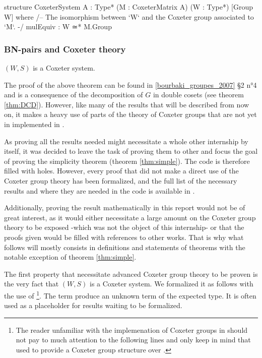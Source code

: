 \begin{leancode}
structure CoxeterSystem {A : Type*} (M : CoxeterMatrix A) (W : Type*) 
    [Group W] where
  /-- The isomorphism between `W` and the Coxeter group associated to `M`. -/
  mulEquiv : W ≃* M.Group
\end{leancode}


\subsubsection{BN-pairs and Coxeter theory}
\label{subsub:Coxeter2}  
\begin{theoreme} \label{thm:Coxeter}
    $\left( W,S \right)$ is a Coxeter system.
\end{theoreme}
 The proof of the above theorem can be found in \ref{bourbaki_groupes_2007} §2 n°4 and is a consequence of the decomposition of $G$ in double cosets (see theorem \ref{thm:DCD}). However, like many of the results that will be described from now on, it makes a heavy use of parts of the theory of Coxeter groups that are not yet in implemented in \Lean. 
    
 As proving all the results needed might necessitate a whole other internship by itself, it was decided to leave the task of proving them to other and focus the goal of proving the simplicity theorem (theorem \ref{thm:simple}). The \Lean code is therefore filled with holes. However, every proof that did not make a direct use of the Coxeter group theory has been formalized, and the full list of the necessary results and where they are needed in the code is available in . 

 Additionally, proving the result mathematically in this report would not be of great interest, as it would either necessitate a large amount on the Coxeter group theory to be exposed -which was not the object of this internship- or that the proofs given would be filled with references to other works. That is why what follows will mostly consists in definitions and statements of theorems with the notable exception of theorem \ref{thm:simple}.

The first property that necessitate advanced Coxeter group theory to be proven is the very fact that $\left( W,S \right)$ is a Coxeter system. We formalized it as follows with the use of  \footnote{The reader unfamiliar with the implemenation of Coxeter groups in \Lean should not pay to much attention to the following lines and only keep in mind that used  to provide a Coxeter group structure over .}. The term  produce an unknown term of the expected type. It is often used as a placeholder for results waiting to be formalized.

